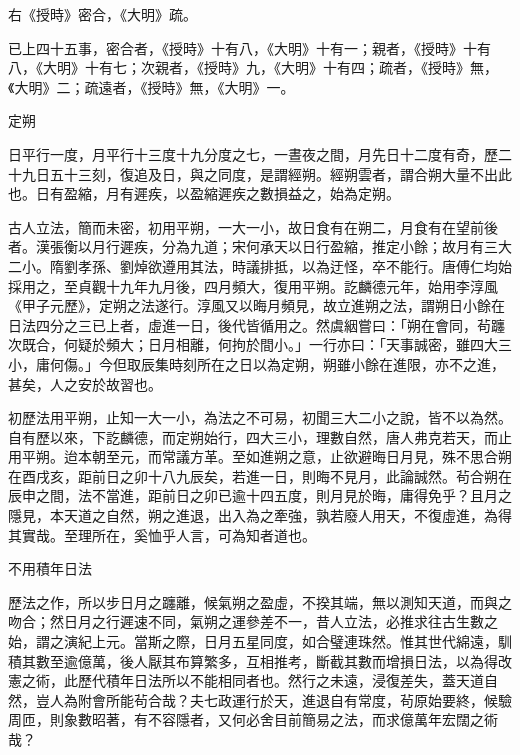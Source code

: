 \begin{pinyinscope}
 右《授時》密合，《大明》疏。



 已上四十五事，密合者，《授時》十有八，《大明》十有一；親者，《授時》十有八，《大明》十有七；次親者，《授時》九，《大明》十有四；疏者，《授時》無，《大明》二；疏遠者，《授時》無，《大明》一。



 定朔



 日平行一度，月平行十三度十九分度之七，一晝夜之間，月先日十二度有奇，歷二十九日五十三刻，復追及日，與之同度，是謂經朔。經朔雲者，謂合朔大量不出此也。日有盈縮，月有遲疾，以盈縮遲疾之數損益之，始為定朔。



 古人立法，簡而未密，初用平朔，一大一小，故日食有在朔二，月食有在望前後者。漢張衡以月行遲疾，分為九道；宋何承天以日行盈縮，推定小餘；故月有三大二小。隋劉孝孫、劉焯欲遵用其法，時議排抵，以為迂怪，卒不能行。唐傅仁均始採用之，至貞觀十九年九月後，四月頻大，復用平朔。訖麟德元年，始用李淳風《甲子元歷》，定朔之法遂行。淳風又以晦月頻見，故立進朔之法，謂朔日小餘在日法四分之三已上者，虛進一日，後代皆循用之。然虞絪嘗曰：「朔在會同，茍躔次既合，何疑於頻大；日月相離，何拘於間小。」一行亦曰：「天事誠密，雖四大三小，庸何傷。」今但取辰集時刻所在之日以為定朔，朔雖小餘在進限，亦不之進，甚矣，人之安於故習也。



 初歷法用平朔，止知一大一小，為法之不可易，初聞三大二小之說，皆不以為然。自有歷以來，下訖麟德，而定朔始行，四大三小，理數自然，唐人弗克若天，而止用平朔。迨本朝至元，而常議方革。至如進朔之意，止欲避晦日月見，殊不思合朔在酉戌亥，距前日之卯十八九辰矣，若進一日，則晦不見月，此論誠然。茍合朔在辰申之間，法不當進，距前日之卯已逾十四五度，則月見於晦，庸得免乎？且月之隱見，本天道之自然，朔之進退，出入為之牽強，孰若廢人用天，不復虛進，為得其實哉。至理所在，奚恤乎人言，可為知者道也。



 不用積年日法



 歷法之作，所以步日月之躔離，候氣朔之盈虛，不揆其端，無以測知天道，而與之吻合；然日月之行遲速不同，氣朔之運參差不一，昔人立法，必推求往古生數之始，謂之演紀上元。當斯之際，日月五星同度，如合璧連珠然。惟其世代綿遠，馴積其數至逾億萬，後人厭其布算繁多，互相推考，斷截其數而增損日法，以為得改憲之術，此歷代積年日法所以不能相同者也。然行之未遠，浸復差失，蓋天道自然，豈人為附會所能茍合哉？夫七政運行於天，進退自有常度，茍原始要終，候驗周匝，則象數昭著，有不容隱者，又何必舍目前簡易之法，而求億萬年宏闊之術哉？




\end{pinyinscope}

